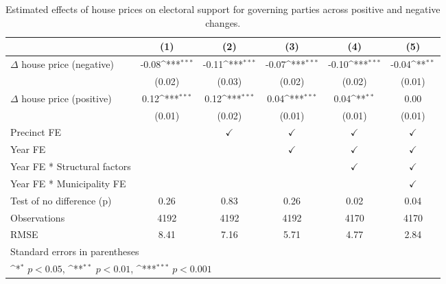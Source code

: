 \begin{table}[htbp]\centering
\def\sym#1{\ifmmode^{#1}\else\(^{#1}\)\fi}
\caption{Estimated effects of house prices on electoral support for governing parties across positive and negative changes.} \label{tab4}
\begin{tabular}{l*{5}{c}}
\hline\hline
                    &\multicolumn{1}{c}{(1)}         &\multicolumn{1}{c}{(2)}         &\multicolumn{1}{c}{(3)}         &\multicolumn{1}{c}{(4)}         &\multicolumn{1}{c}{(5)}         \\
\hline
$\Delta$ house price (negative)&       -0.08\sym{***}&       -0.11\sym{***}&       -0.07\sym{***}&       -0.10\sym{***}&       -0.04\sym{**} \\
                    &      (0.02)         &      (0.03)         &      (0.02)         &      (0.02)         &      (0.01)         \\
[1em]
$\Delta$ house price (positive)&        0.12\sym{***}&        0.12\sym{***}&        0.04\sym{***}&        0.04\sym{**} &        0.00         \\
                    &      (0.01)         &      (0.02)         &      (0.01)         &      (0.01)         &      (0.01)         \\
[1em]
\hline Precinct  FE &                     &$\checkmark$         &$\checkmark$         &$\checkmark$         &$\checkmark$         \\
[1em]
Year FE             &                     &                     &$\checkmark$         &$\checkmark$         &$\checkmark$         \\
[1em]
Year FE * Structural factors&                     &                     &                     &$\checkmark$         &$\checkmark$         \\
[1em]
Year FE * Municipality FE&                     &                     &                     &                     &$\checkmark$         \\
\hline
Test of no difference (p)&        0.26         &        0.83         &        0.26         &        0.02         &        0.04         \\
Observations        &        4192         &        4192         &        4192         &        4170         &        4170         \\
RMSE                &        8.41         &        7.16         &        5.71         &        4.77         &        2.84         \\
\hline\hline
\multicolumn{6}{l}{\footnotesize Standard errors in parentheses}\\
\multicolumn{6}{l}{\footnotesize \sym{*} \(p<0.05\), \sym{**} \(p<0.01\), \sym{***} \(p<0.001\)}\\
\end{tabular}
\end{table}
